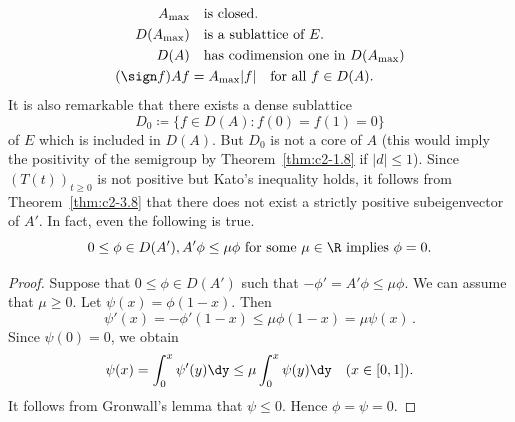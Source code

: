 \begin{align}\label{eq:c2-3.12}
A_{\max} 	& \quad \text{is closed}. \\
D(A_{\max}) & \quad \text{is a sublattice of } E. \\
D(A) & \quad \text{has codimension one in } D(A_{\max}) \\
(\sign  f)Af &= A_{\max}|f| \quad \text{for all } f \in D(A).
\end{align}
It is also remarkable that there exists a dense sublattice 
%
\[
	D_{0} \coloneq \{f \in D(A) \colon f(0) = f(1) = 0\} 
\]
%
of\/ $E$ which is included in $D(A)$.
But $D_{0}$ is not a core of\/ $A$ (this would imply the positivity of the semigroup by Theorem~\ref{thm:c2-1.8}   if\/ $|d| \leq 1$).
Since $(T(t))_{t \geq 0}$ is not positive but Kato's inequality holds, it
follows from Theorem~\ref{thm:c2-3.8}   that there does not exist a strictly positive subeigenvector of\/ $A'$. 
In fact, even the following is true.
\begin{equation} \label{eq:c2-3.16} 
0 \leq \phi \in D(A'),  A'\phi \leq \mu\phi \text{ for some } \mu \in \R \text{ implies } \phi = 0.
\end{equation}
\begin{proof}
Suppose that $0 \leq \phi \in D(A')$ such that $-\phi' = A'\phi \leq \mu\phi$. 
We can assume that $\mu \geq 0$. 
Let $\psi(x) = \phi(1-x)$. 
Then 
\[
\psi'(x) = -\phi'(1-x) \leq \mu\phi(1-x) = \mu\psi(x)\,.
\]
Since $\psi(0) = 0$, we obtain
\begin{equation*} \label{eq:c2-3-KGK} 
\psi(x) = \int_{0}^{x} \psi'(y) \dy \leq \mu \int_{0}^{x} \psi(y) \dy \quad (x \in [0,1]).
\end{equation*}
It follows from Gronwall's lemma that $\psi \leq 0$. Hence $\phi = \psi = 0$.
\end{proof}
